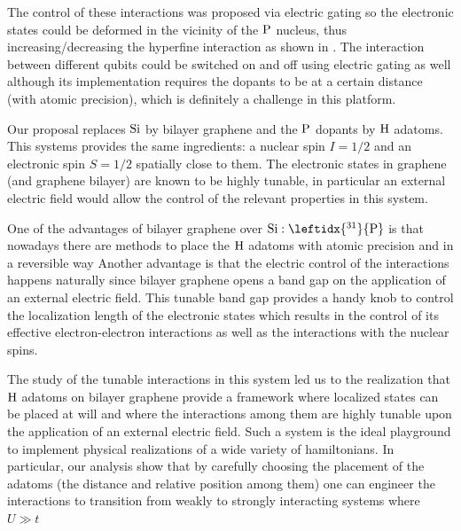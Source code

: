 The control of these interactions was proposed via electric gating so the electronic states could be deformed in the vicinity of the $\ce{P}$ nucleus, thus increasing/decreasing the hyperfine interaction as shown in .
The interaction between different qubits could be switched on and off using electric gating as well although its implementation requires the dopants to be at a certain distance (with atomic precision), which is definitely a challenge in this platform.
\medskip

Our proposal replaces $\ce{Si}$ by bilayer graphene and the $\ce{P}$ dopants by $\ce{H}$ adatoms. This systems provides the same ingredients: a nuclear spin $I=1/2$ and an electronic spin $S=1/2$ spatially close to them. The electronic states in graphene (and graphene bilayer) are known to be highly tunable, in particular an external electric field would allow the control of the relevant properties in this system.

One of the advantages of bilayer graphene over $\ce{Si}:\leftidx{^{31}}{\ce{P}}$ is that nowadays there are methods to place the $\ce{H}$ adatoms with atomic precision and in a reversible way\cite{elias2009,Brihuega2016,Brihuega2017}
Another advantage is that the electric control of the interactions happens naturally since bilayer graphene opens a band gap on the application of an external electric field\cite{McCann2006, Castro2007, Oostinga2007, Zhang2009, Taychatanapat2010, Castro2010a, Ponomarenko2011, Allen2012, Sui2015}. This tunable band gap provides a handy knob to control the localization length of the electronic states which results in the control of its effective electron-electron interactions as well as the interactions with the nuclear spins.
\medskip

The study of the tunable interactions in this system led us to the realization that $\ce{H}$ adatoms on bilayer graphene provide a framework where localized states can be placed at will and where the interactions among them are highly tunable upon the application of an external electric field.
Such a system is the ideal playground to implement physical realizations of a wide variety of hamiltonians.
In particular, our analysis show that by carefully choosing the placement of the adatoms (the distance and relative position among them) one can engineer the interactions to transition from weakly to strongly interacting systems where $U\gg t$
\bigskip

